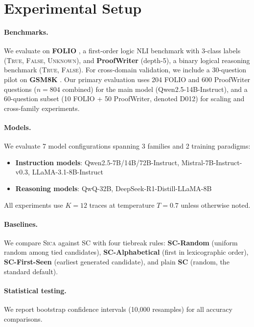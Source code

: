 \documentclass[11pt,a4paper]{article}
\newcommand{\sica}{\textsc{Sica}}
\begin{document}
\section{Experimental Setup}
\label{sec:setup}

\paragraph{Benchmarks.}
We evaluate on \textbf{FOLIO} \cite{han2022folio}, a first-order logic NLI benchmark with 3-class labels (\textsc{True}, \textsc{False}, \textsc{Unknown}), and \textbf{ProofWriter} \cite{tafjord2021proofwriter} (depth-5), a binary logical reasoning benchmark (\textsc{True}, \textsc{False}).
For cross-domain validation, we include a 30-question pilot on \textbf{GSM8K} \cite{cobbe2021gsm8k}.
Our primary evaluation uses 204 FOLIO and 600 ProofWriter questions ($n{=}804$ combined) for the main model (Qwen2.5-14B-Instruct), and a 60-question subset (10 FOLIO + 50 ProofWriter, denoted D012) for scaling and cross-family experiments.

\paragraph{Models.}
We evaluate 7 model configurations spanning 3 families and 2 training paradigms:
\begin{itemize}[nosep,leftmargin=*]
  \item \textbf{Instruction models}: Qwen2.5-7B/14B/72B-Instruct, Mistral-7B-Instruct-v0.3, LLaMA-3.1-8B-Instruct
  \item \textbf{Reasoning models}: QwQ-32B, DeepSeek-R1-Distill-LLaMA-8B
\end{itemize}
All experiments use $K{=}12$ traces at temperature $T{=}0.7$ unless otherwise noted.

\paragraph{Baselines.}
We compare \sica{} against SC with four tiebreak rules: \textbf{SC-Random} (uniform random among tied candidates), \textbf{SC-Alphabetical} (first in lexicographic order), \textbf{SC-First-Seen} (earliest generated candidate), and plain \textbf{SC} (random, the standard default).

\paragraph{Statistical testing.}
We report bootstrap confidence intervals (10,000 resamples) for all accuracy comparisons.
\end{document}
